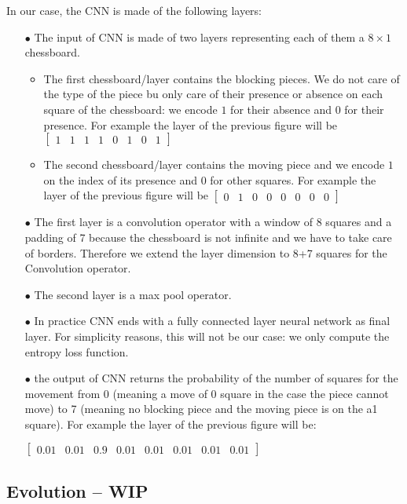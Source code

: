 \documentclass[a4paper,10pt]{article}
\begin{document}
In our case, the CNN is made of the following layers:
\begin{itemize}
\item[$\bullet$] The input of CNN is made of two layers representing each of
  them a $8 \times 1$ chessboard.
  \begin{itemize}
  \item The first chessboard/layer contains the blocking pieces. We do not care
    of the type of the piece bu only care of their presence or absence on each
    square of the chessboard: we encode $1$ for their absence and $0$ for their
    presence. For example the layer of the previous figure will be $\begin{bmatrix}
      1 & 1 & 1 & 1 & 0 & 1 & 0 & 1 \end{bmatrix}$
  \item The second chessboard/layer contains the moving piece and we encode $1$
    on the index of its presence and $0$ for other squares. For example the
    layer of the previous figure will be $\begin{bmatrix} 0 & 1 & 0 & 0 & 0 & 0
      & 0 & 0 \end{bmatrix}$
  \end{itemize}
\item[$\bullet$] The first layer is a convolution operator with a window of 8
  squares and a padding of 7 because the chessboard is not infinite and we have
  to take care of borders. Therefore we extend the layer dimension to 8+7
  squares for the Convolution operator.
\item[$\bullet$] The second layer is a max pool operator.
\item[$\bullet$] In practice CNN ends with a fully connected layer neural
  network as final layer. For simplicity reasons, this will not be our case: we
  only compute the entropy loss function.
\item[$\bullet$] the output of CNN returns the probability of the number of
  squares for the movement from 0 (meaning a move of 0 square in the case the
  piece cannot move) to 7 (meaning no blocking piece and the moving piece is on
  the a1 square). For example the layer of the previous figure will be:

  $\begin{bmatrix} 0.01 & 0.01 & 0.9 & 0.01 & 0.01 & 0.01 & 0.01 & 0.01 \end{bmatrix}$
\end{itemize}

\subsection{Evolution -- WIP}
\end{document}
